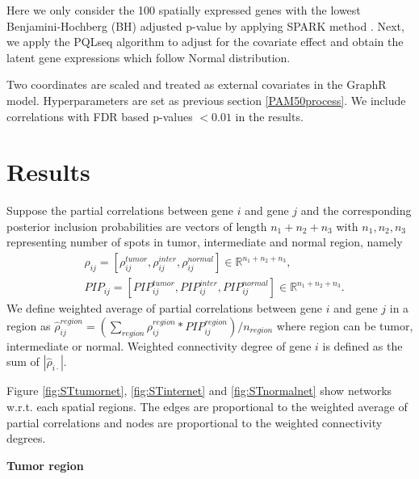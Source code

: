 \documentclass[
]{book}
\begin{document}
Here we only consider the 100 spatially expressed genes with the lowest Benjamini-Hochberg (BH) adjusted p-value by applying SPARK method \citep{sun2020statistical}. Next, we apply the PQLseq \citep{sun2019heritability} algorithm to adjust for the covariate effect and obtain the latent gene expressions which follow Normal distribution.

Two coordinates are scaled and treated as external covariates in the GraphR model. Hyperparameters are set as previous section \ref{PAM50process}. We include correlations with FDR based p-values \(<0.01\) in the results.

\hypertarget{STBCresult}{%
\section{Results}\label{STBCresult}}

Suppose the partial correlations between gene \(i\) and gene \(j\) and the corresponding posterior inclusion probabilities are vectors of length \(n_1+n_2+n_3\) with \(n_1,n_2,n_3\) representing number of spots in tumor, intermediate and normal region, namely
\begin{equation}
\begin{split}
& \rho_{ij} = [\rho_{ij}^{tumor}, \rho_{ij}^{inter}, \rho_{ij}^{normal}] \in \mathbb{R}^{n_1+n_2+n_3}, \\
& PIP_{ij} = [PIP_{ij}^{tumor}, PIP_{ij}^{inter}, PIP_{ij}^{normal}] \in \mathbb{R}^{n_1+n_2+n_3}.
\end{split}
\end{equation}
We define weighted average of partial correlations between gene \(i\) and gene \(j\) in a region as \(\hat{\rho}_{ij}^{region}= (\sum_{region} \rho_{ij}^{region} * PIP_{ij}^{region})/n_{region}\) where region can be tumor, intermediate or normal. Weighted connectivity degree of gene \(i\) is defined as the sum of \(|\hat{\rho}_{i\cdot}|\).

Figure \ref{fig:STtumornet}, \ref{fig:STinternet} and \ref{fig:STnormalnet} show networks w.r.t. each spatial regions. The edges are proportional to the weighted average of partial correlations and nodes are proportional to the weighted connectivity degrees.

\textbf{Tumor region}
\end{document}
